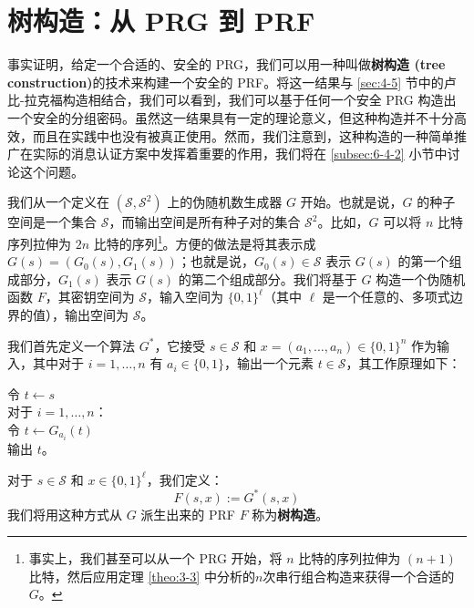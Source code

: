 \section{树构造：从 PRG 到 PRF}

事实证明，给定一个合适的、安全的 PRG，我们可以用一种叫做\textbf{树构造 (tree construction)}的技术来构建一个安全的 PRF。将这一结果与 \ref{sec:4-5} 节中的卢比-拉克福构造相结合，我们可以看到，我们可以基于任何一个安全 PRG 构造出一个安全的分组密码。虽然这一结果具有一定的理论意义，但这种构造并不十分高效，而且在实践中也没有被真正使用。然而，我们注意到，这种构造的一种简单推广在实际的消息认证方案中发挥着重要的作用，我们将在 \ref{subsec:6-4-2} 小节中讨论这个问题。

我们从一个定义在 $(\mathcal{S},\mathcal{S}^2)$ 上的伪随机数生成器 $G$ 开始。也就是说，$G$ 的种子空间是一个集合 $\mathcal{S}$，而输出空间是所有种子对的集合 $\mathcal{S}^2$。比如，$G$ 可以将 $n$ 比特序列拉伸为 $2n$ 比特的序列\footnote[2]{事实上，我们甚至可以从一个 PRG 开始，将 $n$ 比特的序列拉伸为 $(n+1)$ 比特，然后应用定理 \ref{theo:3-3} 中分析的$n$次串行组合构造来获得一个合适的 $G$。}。方便的做法是将其表示成$G(s) = (G_0(s),G_1(s))$；也就是说，$G_0(s)\in\mathcal{S}$ 表示 $G(s)$ 的第一个组成部分，$G_1(s)$ 表示 $G(s)$ 的第二个组成部分。我们将基于 $G$ 构造一个伪随机函数 $F$，其密钥空间为 $\mathcal{S}$，输入空间为 $\{0,1\}^\ell$（其中 $\ell$ 是一个任意的、多项式边界的值），输出空间为 $\mathcal{S}$。

我们首先定义一个算法 $G^*$，它接受 $s\in\mathcal{S}$ 和 $x=(a_1,\dots,a_n)\in\{0,1\}^n$ 作为输入，其中对于 $i=1,\dots,n$ 有 $a_i\in\{0,1\}$，输出一个元素 $t\in\mathcal{S}$，其工作原理如下：

\vspace{5pt}

\hspace*{5pt} 令 $t\leftarrow s$\\
\hspace*{26pt} 对于 $i=1,\dots,n$：\\
\hspace*{50pt} 令 $t\leftarrow G_{a_i}(t)$\\
\hspace*{26pt} 输出 $t$。

\vspace{5pt}

\noindent
对于 $s\in\mathcal{S}$ 和 $x\in\{0,1\}^\ell$，我们定义：
\[
F(s,x):=G^*(s,x)
\]
我们将用这种方式从 $G$ 派生出来的 PRF $F$ 称为\textbf{树构造}。

